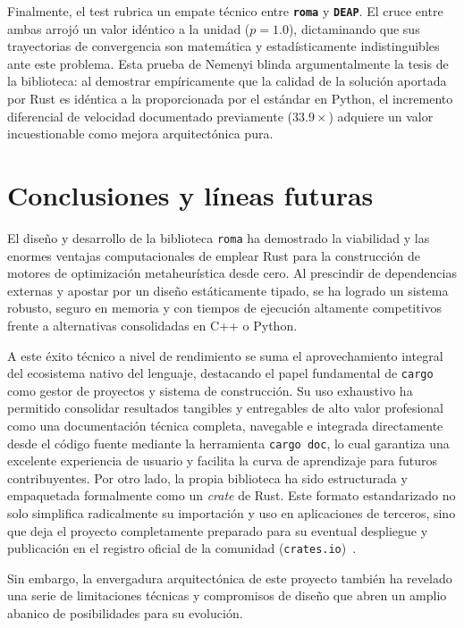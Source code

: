 \documentclass[12pt,a4paper,twoside,openright]{book}
\begin{document}
    Finalmente, el test rubrica un empate técnico entre \textbf{\texttt{roma}} y \textbf{\texttt{DEAP}}. El cruce entre ambas arrojó un valor idéntico a la unidad ($p = 1.0$), dictaminando que sus trayectorias de convergencia son matemática y estadísticamente indistinguibles ante este problema. Esta prueba de Nemenyi blinda argumentalmente la tesis de la biblioteca: al demostrar empíricamente que la calidad de la solución aportada por Rust es idéntica a la proporcionada por el estándar en Python, el incremento diferencial de velocidad documentado previamente ($33.9\times$) adquiere un valor incuestionable como mejora arquitectónica pura.


\chapter{Conclusiones y líneas futuras}
    El diseño y desarrollo de la biblioteca \texttt{roma} ha demostrado la viabilidad y las enormes ventajas computacionales de emplear Rust para la construcción de motores de optimización metaheurística desde cero. Al prescindir de dependencias externas y apostar por un diseño estáticamente tipado, se ha logrado un sistema robusto, seguro en memoria y con tiempos de ejecución altamente competitivos frente a alternativas consolidadas en C++ o Python. 

    A este éxito técnico a nivel de rendimiento se suma el aprovechamiento integral del ecosistema nativo del lenguaje, destacando el papel fundamental de \texttt{cargo} como gestor de proyectos y sistema de construcción. Su uso exhaustivo ha permitido consolidar resultados tangibles y entregables de alto valor profesional como una documentación técnica completa, navegable e integrada directamente desde el código fuente mediante la herramienta \texttt{cargo doc}, lo cual garantiza una excelente experiencia de usuario y facilita la curva de aprendizaje para futuros contribuyentes. Por otro lado, la propia biblioteca ha sido estructurada y empaquetada formalmente como un \textit{crate} de Rust. Este formato estandarizado no solo simplifica radicalmente su importación y uso en aplicaciones de terceros, sino que deja el proyecto completamente preparado para su eventual despliegue y publicación en el registro oficial de la comunidad (\texttt{crates.io})~\cite{crates_io}.

    Sin embargo, la envergadura arquitectónica de este proyecto también ha revelado una serie de limitaciones técnicas y compromisos de diseño que abren un amplio abanico de posibilidades para su evolución.
\end{document}
